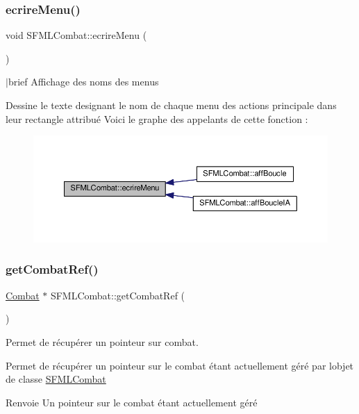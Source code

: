 \subsubsection{\texorpdfstring{ecrire\+Menu()}{ecrireMenu()}}
{\footnotesize\ttfamily void S\+F\+M\+L\+Combat\+::ecrire\+Menu (\begin{DoxyParamCaption}{ }\end{DoxyParamCaption})\hspace{0.3cm}{\ttfamily [private]}}

$\vert$brief Affichage des noms des menus

Dessine le texte designant le nom de chaque menu des actions principale dans leur rectangle attribué Voici le graphe des appelants de cette fonction \+:\nopagebreak
\begin{figure}[H]
\begin{center}
\leavevmode
\includegraphics[width=350pt]{class_s_f_m_l_combat_a557bb97c785650b8d28ff913ca86081a_icgraph}
\end{center}
\end{figure}
\mbox{\label{class_s_f_m_l_combat_a1529363beee93ae18694046822ea2e53}} 
\subsubsection{\texorpdfstring{get\+Combat\+Ref()}{getCombatRef()}}
{\footnotesize\ttfamily \hyperlink{class_combat}{Combat} $\ast$ S\+F\+M\+L\+Combat\+::get\+Combat\+Ref (\begin{DoxyParamCaption}{ }\end{DoxyParamCaption})\hspace{0.3cm}{\ttfamily [private]}}



Permet de récupérer un pointeur sur combat. 

Permet de récupérer un pointeur sur le combat étant actuellement géré par l\textquotesingle{}objet de classe \hyperlink{class_s_f_m_l_combat}{S\+F\+M\+L\+Combat} \begin{DoxyReturn}{Renvoie}
Un pointeur sur le combat étant actuellement géré 
\end{DoxyReturn}
\mbox{\label{class_s_f_m_l_combat_a5d363c2d06e7f0505990bf12866d0595}} 
